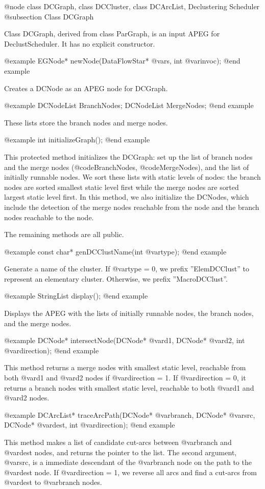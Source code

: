 @node class DCGraph, class DCCluster, class DCArcList, Declustering Scheduler
@subsection Class DCGraph

Class DCGraph, derived from class ParGraph, is an input APEG for
DeclustScheduler. It has no explicit constructor.

@example
EGNode* newNode(DataFlowStar* @var{s}, int @var{invoc});
@end example

Creates a DCNode as an APEG node for DCGraph.

@example
DCNodeList BranchNodes;
DCNodeList MergeNodes;
@end example

These lists store the branch nodes and merge nodes.

@example
int initializeGraph();
@end example

This protected method initializes the DCGraph: set up the list of branch 
nodes and
the merge nodes (@code{BranchNodes}, @code{MergeNodes}), and the list of
initially runnable nodes. We sort these lists with static levels of nodes:
the branch nodes are sorted smallest static level first while the merge
nodes are sorted largest static level first. In this method, we also
initialize the DCNodes, which include the detection of the merge nodes
reachable from the node and the branch nodes reachable to the node.

The remaining methods are all public.

@example
const char* genDCClustName(int @var{type});
@end example

Generate a name of the cluster. If @var{type} = 0, we prefix ''ElemDCClust''
to represent an elementary cluster. Otherwise, we prefix ''MacroDCClust''.

@example
StringList display();
@end example

Displays the APEG with the lists of initially runnable nodes, the branch
nodes, and the merge nodes.

@example
DCNode* intersectNode(DCNode* @var{d1}, DCNode* @var{d2}, int @var{direction});
@end example

This method returns a merge nodes with smallest static level, reachable from
both @var{d1} and @var{d2} nodes if @var{direction} = 1. 
If @var{direction} = 0, it returns a branch nodes with smallest static level,
reachable to both @var{d1} and @var{d2} nodes.

@example
DCArcList* traceArcPath(DCNode* @var{branch}, DCNode* @var{src}, DCNode* @var{dest}, int @var{direction});
@end example

This method makes a list of candidate cut-arcs between @var{branch} and
@var{dest} nodes, and returns the pointer to the list. 
The second argument, @var{src}, is a immediate
descendant of the @var{branch} node on the path to the @var{dest} node.
If @var{direction} = 1, we reverse all arcs and find a cut-arcs from 
@var{dest} to @var{branch} nodes.

